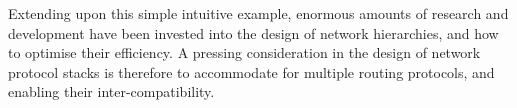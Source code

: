 Extending upon this simple intuitive example, enormous amounts of research and development have been invested into the design of network hierarchies, and how to optimise their efficiency. A pressing consideration in the design of network protocol stacks is therefore to accommodate for multiple routing protocols, and enabling their inter-compatibility.